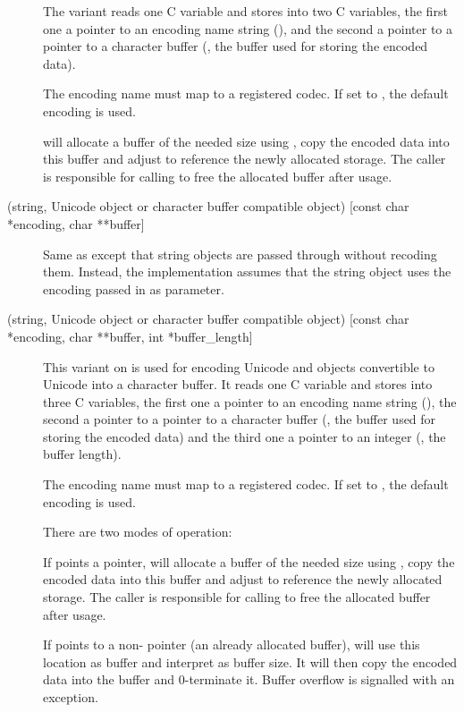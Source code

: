 \begin{description}
The variant reads one C variable and stores into two C variables, the
first one a pointer to an encoding name string (), and the
second a pointer to a pointer to a character buffer (,
the buffer used for storing the encoded data).

The encoding name must map to a registered codec. If set to \NULL,
the default encoding is used.

 will allocate a buffer of the needed
size using , copy the encoded data into this
buffer and adjust  to reference the newly allocated
storage. The caller is responsible for calling
 to free the allocated buffer after usage.

\item[\samp{et} (string, Unicode object or character buffer compatible
object) {[const char *encoding, char **buffer]}]
Same as  except that string objects are passed through without
recoding them. Instead, the implementation assumes that the string
object uses the encoding passed in as parameter.

\item[\samp{es\#} (string, Unicode object or character buffer compatible
object) {[const char *encoding, char **buffer, int *buffer_length]}]
This variant on  is used for encoding Unicode and objects
convertible to Unicode into a character buffer. It reads one C
variable and stores into three C variables, the first one a pointer to
an encoding name string (), the second a pointer to a
pointer to a character buffer (, the buffer used for
storing the encoded data) and the third one a pointer to an integer
(, the buffer length).

The encoding name must map to a registered codec. If set to \NULL,
the default encoding is used.

There are two modes of operation: 

If  points a \NULL{} pointer,
 will allocate a buffer of the needed
size using , copy the encoded data into this
buffer and adjust  to reference the newly allocated
storage. The caller is responsible for calling
 to free the allocated buffer after usage.

If  points to a non-\NULL{} pointer (an already allocated
buffer),  will use this location as
buffer and interpret  as buffer size. It will then
copy the encoded data into the buffer and 0-terminate it. Buffer
overflow is signalled with an exception.


\end{description}
